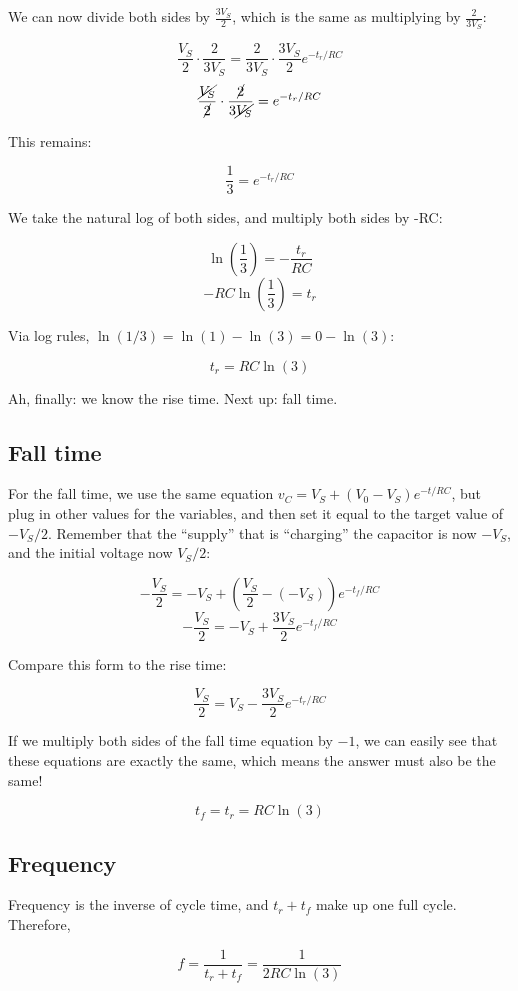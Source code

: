 \documentclass[12pt,a4paper]{report}
\begin{document}
We can now divide both sides by $\displaystyle \frac{3 V_S}{2}$, which is the same as multiplying by $\displaystyle \frac{2}{3 V_S}$:

\[ \frac{V_S}{2} \cdot \frac{2}{3 V_S} = \frac{2}{3 V_S} \cdot \frac{3V_S}{2} e^{-t_r/RC} \]
\[ \frac{\cancel{V_S}}{\cancel{2}} \cdot \frac{\cancel{2}}{3 \cancel{V_S}} = e^{-t_r/RC} \]

This remains:

\[ \frac{1}{3} = e^{-t_r/RC} \]

We take the natural log of both sides, and multiply both sides by -RC:

\[ \ln{\left(\frac{1}{3}\right)} = -\frac{t_r}{RC} \]
\[ -RC \ln{\left(\frac{1}{3}\right)} = t_r \]

Via log rules, $\ln{(1/3)} = \ln{(1)} - \ln{(3)} = 0 - \ln{(3)}$:

\[ t_r = RC \ln{(3)} \]

Ah, finally: we know the rise time. Next up: fall time.

\subsection{Fall time}
For the fall time, we use the same equation $v_C = V_S + (V_0 - V_S)e^{-t/RC}$, but plug in other values for the variables, and then set it equal to the target value of $-V_S/2$. Remember that the ``supply'' that is ``charging'' the capacitor is now $-V_S$, and the initial voltage now $V_S/2$:

\[ -\frac{V_S}{2} = -V_S + (\frac{V_S}{2} - (-V_S))e^{-t_f/RC} \]
\[ -\frac{V_S}{2} = -V_S + \frac{3 V_S}{2} e^{-t_f/RC} \]

Compare this form to the rise time:

\[ \frac{V_S}{2} = V_S - \frac{3V_S}{2} e^{-t_r/RC} \]

If we multiply both sides of the fall time equation by $-1$, we can easily see that these equations are exactly the same, which means the answer must also be the same!

\[ t_f = t_r = RC \ln{(3)} \]

\subsection{Frequency}
Frequency is the inverse of cycle time, and $t_r + t_f$ make up one full cycle. Therefore,

\[ f = \frac{1}{t_r + t_f} = \frac{1}{2 RC \ln{(3)}} \]
\end{document}
